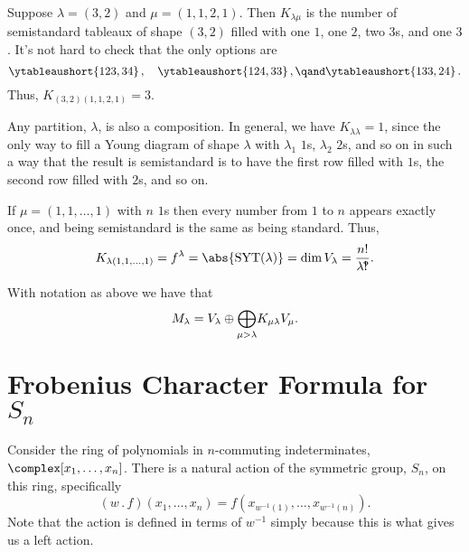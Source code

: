\documentclass[fleqn]{NotesClass}
\newcommand{\action}{\mathbin{.}}
\DeclareMathOperator{\standardYoungTableaux}{SYT}
\newcommand{\intterobang}{\mathchoice{!\mkern-6.1mu?}{!\mkern-6.2mu?}{!\mkern-6.8mu?}{!\mkern-6.8mu?}}
\begin{document}
    \begin{exm}{}{}
        Suppose \(\lambda = (3, 2)\) and \(\mu = (1, 1, 2, 1)\).
        Then \(K_{\lambda\mu}\) is the number of semistandard tableaux of shape \((3, 2)\) filled with one \(1\), one \(2\), two \(3\)s, and one \(3\).
        It's not hard to check that the only options are
        \begin{equation}
            \ytableaushort{123,34}\,,\quad \ytableaushort{124,33}\,,\qand \ytableaushort{133,24}\,.
        \end{equation}
        Thus, \(K_{(3,2)(1,1,2,1)} = 3\).
        
        Any partition, \(\lambda\), is also a composition.
        In general, we have \(K_{\lambda\lambda} = 1\), since the only way to fill a Young diagram of shape \(\lambda\) with \(\lambda_1\) \(1\)s, \(\lambda_2\) \(2\)s, and so on in such a way that the result is semistandard is to have the first row filled with \(1\)s, the second row filled with \(2\)s, and so on.
        
        If \(\mu = (1, 1, \dotsc, 1)\) with \(n\) \(1\)s then every number from \(1\) to \(n\) appears exactly once, and being semistandard is the same as being standard.
        Thus,
        \begin{equation}
            K_{\lambda(1, 1, \dotsc, 1)} = f^\lambda = \abs{\standardYoungTableaux(\lambda)} = \dim V_\lambda = \frac{n!}{\lambda \intterobang}.
        \end{equation}
    \end{exm}
    
    \begin{prp}{}{}
        With notation as above we have that
        \begin{equation}
            M_\lambda = V_\lambda \oplus \vphantom{\bigoplus}\smash{\bigoplus_{\mu > \lambda}} K_{\mu\lambda} V_\mu.
        \end{equation}
    \end{prp}
    
    \section{Frobenius Character Formula for \texorpdfstring{\(S_n\)}{Sn}}
    Consider the ring of polynomials in \(n\)-commuting indeterminates, \(\complex[x_1, \dotsc, x_n]\).
    There is a natural action of the symmetric group, \(S_n\), on this ring, specifically
    \begin{equation}
        (w \action f)(x_1, \dotsc, x_n) = f(x_{w^{-1}(1)}, \dotsc, x_{w^{-1}(n)}).
    \end{equation}
    Note that the action is defined in terms of \(w^{-1}\) simply because this is what gives us a left action.
    
\end{document}
